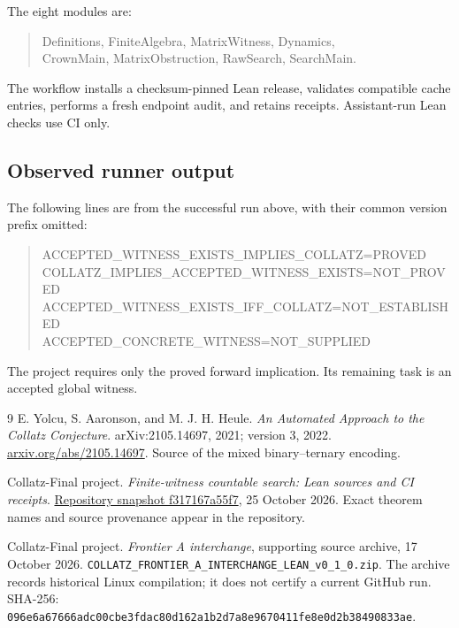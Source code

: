 \documentclass[11pt,a4paper]{article}
\theoremstyle{definition}
\newcommand{\name}[1]{{\small\texttt{#1}}}
\begin{document}
The eight modules are:
\begin{quote}\small\ttfamily
Definitions, FiniteAlgebra, MatrixWitness, Dynamics,\\
CrownMain, MatrixObstruction, RawSearch, SearchMain.
\end{quote}
The workflow installs a checksum-pinned Lean release, validates compatible
cache entries, performs a fresh endpoint audit, and retains receipts.
Assistant-run Lean checks use CI only.

\subsection*{Observed runner output}
The following lines are from the successful run above, with their common
version prefix omitted:
\begin{quote}\footnotesize\ttfamily
ACCEPTED\_WITNESS\_EXISTS\_IMPLIES\_COLLATZ=PROVED\\
COLLATZ\_IMPLIES\_ACCEPTED\_WITNESS\_EXISTS=NOT\_PROVED\\
ACCEPTED\_WITNESS\_EXISTS\_IFF\_COLLATZ=NOT\_ESTABLISHED\\
ACCEPTED\_CONCRETE\_WITNESS=NOT\_SUPPLIED
\end{quote}
The project requires only the proved forward implication. Its remaining task
is an accepted global witness.

{\raggedright
\begin{thebibliography}{9}\small
{}
E. Yolcu, S. Aaronson, and M. J. H. Heule.
\emph{An Automated Approach to the Collatz Conjecture}.
arXiv:2105.14697, 2021; version 3, 2022.
\href{https://arxiv.org/abs/2105.14697}{arxiv.org/abs/2105.14697}.
Source of the mixed binary--ternary encoding.

Collatz-Final project.
\emph{Finite-witness countable search: Lean sources and CI receipts}.
\href{https://github.com/randogelist/Collatz-Final/tree/f317167a55f7c6b5a815837f5a84a3c693946744}
{Repository snapshot f317167a55f7}, 25 October 2026.
Exact theorem names and source provenance appear in the repository.

Collatz-Final project.
\emph{Frontier A interchange}, supporting source archive, 17 October 2026.
\name{COLLATZ\_FRONTIER\_A\_INTERCHANGE\_LEAN\_v0\_1\_0.zip}.
The archive records historical Linux compilation; it does not certify a
current GitHub run. SHA-256:
{\scriptsize\texttt{096e6a67666adc00cbe3fdac80d162a1b2d7a8e9670411fe8e0d2b38490833ae}}.
\end{thebibliography}}
\endgroup
\end{document}

